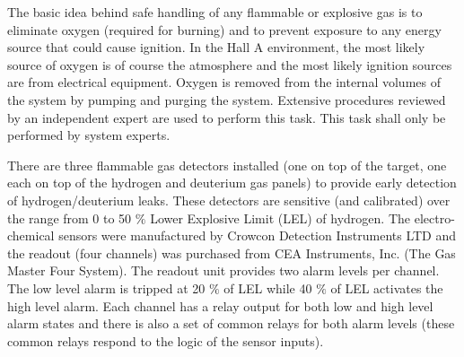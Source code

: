 \begin{safetyen}{0}{0}
The basic idea behind safe handling of any flammable or explosive
gas is to eliminate oxygen (required for burning) and to prevent exposure
to any energy source that could cause ignition. In the Hall A environment,
the most likely source of oxygen is of course the atmosphere and the
most likely ignition sources are from electrical equipment. Oxygen
is removed from the internal volumes of the system by pumping and
purging the system. Extensive procedures reviewed by an independent
expert are used to perform this task. This task shall only be performed
by system experts.

There are three flammable gas detectors installed (one on top of the
target, one each on top of the hydrogen and deuterium gas panels)
to provide early detection of hydrogen/deuterium leaks. These detectors
are sensitive (and calibrated) over the range from 0 to 50 $\%$ Lower
Explosive Limit (LEL) of hydrogen. The electro-chemical sensors were
manufactured by Crowcon Detection Instruments LTD and the readout
(four channels) was purchased from CEA Instruments, Inc. (The Gas
Master Four System). The readout unit provides two alarm levels per
channel. The low level alarm is tripped at 20 $\%$ of LEL while 40
$\%$ of LEL activates the high level alarm. Each channel has a relay
output for both low and high level alarm states and there is also
a set of common relays for both alarm levels (these common relays
respond to the logic of the sensor
inputs). 

\end{safetyen}
